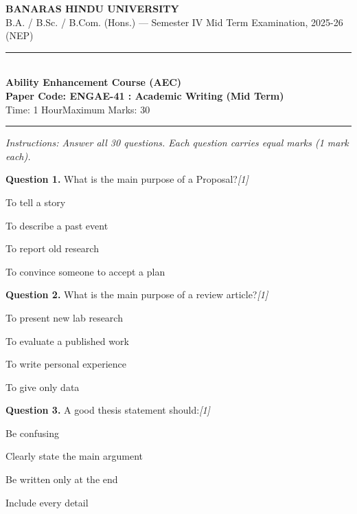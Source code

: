 \documentclass[11pt,a4paper]{article}
\newcommand{\pts}[1]{\hfill   \textit{[#1]}}
\begin{document}
\begin{center}
  {\large\bfseries BANARAS HINDU UNIVERSITY}\\[2pt]
  {\normalsize B.A. / B.Sc. / B.Com. (Hons.) --- Semester IV Mid Term Examination, 2025-26 (NEP)}\\[6pt]
  \rule{0.8\linewidth}{0.5pt}\\[6pt]
  {\large\bfseries Ability Enhancement Course (AEC)}\\[4pt]
  {\large\bfseries Paper Code: ENGAE-41 : Academic Writing (Mid Term)}\\[4pt]
  {\normalsize Time: 1 Hour\hfill Maximum Marks: 30}
\end{center}

\rule{\linewidth}{0.4pt}

\smallskip



\noindent   \textit{Instructions: Answer all 30 questions. Each question carries equal marks (1 mark each).}

\bigskip




\noindent   \textbf{Question 1.} What is the main purpose of a Proposal?\pts{1}

\begin{parts}
  \item To tell a story
  \item To describe a past event
  \item To report old research
  \item To convince someone to accept a plan
\end{parts}

\medskip




\noindent   \textbf{Question 2.} What is the main purpose of a review article?\pts{1}

\begin{parts}
  \item To present new lab research
  \item To evaluate a published work
  \item To write personal experience
  \item To give only data
\end{parts}

\medskip




\noindent   \textbf{Question 3.} A good thesis statement should:\pts{1}

\begin{parts}
  \item Be confusing
  \item Clearly state the main argument
  \item Be written only at the end
  \item Include every detail
\end{parts}
\end{document}
